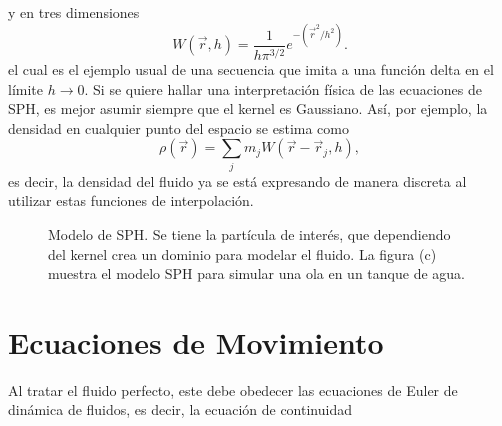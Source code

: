 \documentclass[a4paper,openright,12pt]{book}
\begin{document}
y en tres dimensiones
\begin{equation}
W(\vec{r},h)
  =
  \frac{1}{h \pi^{3/2}} e^{-(\vec{r}^{2}/h^{2})}.\label{eqn 2.22}
\end{equation}
el cual es el ejemplo usual de una secuencia que imita a una función delta en el límite $h \rightarrow 0$. Si se quiere hallar una interpretación física de las ecuaciones de SPH, es mejor asumir siempre que el kernel es Gaussiano. Así, por ejemplo, la densidad en cualquier punto del espacio se estima como
\begin{equation}
\rho(\vec{r})
=
\sum_{j} m_{j} W (\vec{r}-\vec{r}_{j},h),\label{eqn 2.23}
\end{equation}
es decir, la densidad del fluido ya se está expresando de manera discreta al utilizar estas funciones de interpolación.
\begin{figure}
\centering
{}
\caption{\footnotesize{Modelo de SPH. Se tiene la partícula de interés, que dependiendo del kernel crea un dominio para modelar el fluido. La figura (c) muestra el modelo SPH para simular una ola en un tanque de agua.}} \label{fig 2.2}
\end{figure}


\section{Ecuaciones de Movimiento}
Al tratar el fluido perfecto, este debe obedecer las ecuaciones de Euler de dinámica de fluidos, es decir, la ecuación de continuidad
\end{document}
